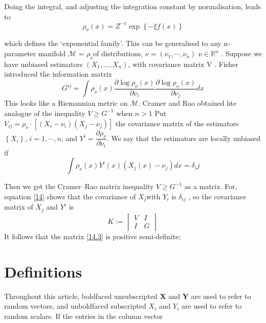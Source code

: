 Doing the integral, and adjusting the integration constant by normalisation, leads
to
\begin{equation*}
 \rho_{\nu}(x) = Z^{-1} \exp \left\lbrace - \xi f(x) \right\rbrace
\end{equation*}

which defines the ‘exponential family’.
This can be generalised to any n-parameter manifold $\mathcal{M}$ = {$
\rho_{\nu}$}of distributions,
$\nu = (\nu_1,\cdots,\nu_n)$
$\nu \in \mathbb{R}^n$ . Suppose we have unbiased estimators $(X_1 , . . . , X_n )$,
with covariance matrix V . Fisher introduced the information matrix
\begin{equation}G^{ij} = \int
\rho_{\nu}(x) \frac{
\partial \log \rho_{\nu}(x)}{\partial \nu_{i}} \frac{
\partial \log \rho_{\nu}(x)}{\partial \nu_{j}} dx
\end{equation}
This looks like a Riemannian metric on $\mathcal{M}$. Cramer and Rao obtained hte analogue of the inequality
$V \geq G^{-1}$ when $n \gt 1$
Put $V_{ij} = \rho_{\nu} \cdot [\left( X_{i} - \nu_{i} \right)\left( X_j - \nu_j \right)]$
the covariance matrix of the estimators $\left\lbrace X_i\right\rbrace$, $i = 1,\cdots, n$, and 
$Y^{i} = \dfrac{\partial \rho_{\nu}} { \partial \nu_{i}}$. We say that the estimators are locally unbiased if
\begin{equation}\label{14}
 \int \rho_{\nu}(x) Y^i(x)(X_j(x) - \nu_j)dx = \delta_ij
\end{equation}

Then we get the Cramer–Rao matrix inequality $V \geq G^{-1}$ as a matrix. 
For, equation \ref{14} shows that the covariance of $X_{j}$with $Y_i$ is $\delta_{ij}$ , so the covariance matrix
of $X_{j}$ and $Y^i$ is
\begin{equation}\label{14.3}
K:=
\begin{vmatrix}
V &
I \\
I &
G 
\end{vmatrix} 
\end{equation}
It follows that the matrix \ref{14.3} is positive semi-definite;

\appendix
\section{Definitions}
 Throughout this article, boldfaced unsubscripted \textbf{X} and \textbf{Y} 
 are used to refer to random vectors, and unboldfaced subscripted 
 $X_i$ and $Y_i$  are used to refer to random scalars.   If the entries in the column vector

